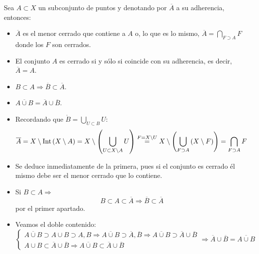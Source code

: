 \begin{prop}
Sea $A\subset X$ un subconjunto de puntos y denotando por $\overline{A}$ a su adherencia, entonces:
\begin{itemize}
\item $\overline{A}$ es el menor cerrado que contiene a $A$ o, lo que es lo mismo, $\overline{A} = \bigcap_{F \supset A} F$ donde los $F$ son cerrados.

\item El conjunto $A$ es cerrado si y sólo si coincide con su adherencia, es decir, $\overline{A} = A$.

\item $B \subset A \Rightarrow \overline{B} \subset \overline{A}$.
\item $\overline{A \cup B} = \overline{A} \cup \overline{B}$.
\end{itemize}
\end{prop}
\begin{demo}
\begin{itemize}
\item Recordando que $\mathring{B} = \bigcup_{U \subset B} U$:
$$
\overline{A} = X \setminus \operatorname{Int}\left( X \setminus A \right) = X \setminus \left(\bigcup_{U \subset X \setminus A} U \right) \stackrel{F = X \setminus U}{=} X \setminus \left(\bigcup_{F \supset A} \left( X \setminus F \right) \right) = \bigcap_{F \supset A} F
$$
\item Se deduce inmediatamente de la primera, pues si el conjunto es cerrado él mismo debe ser el menor cerrado que lo contiene.
\item Si $B \subset A \Rightarrow$
$$
B \subset A \subset \overline{A} \Rightarrow \overline{B} \subset \overline{A}
$$
por el primer apartado.
\item Veamos el doble contenido:
$$
\begin{cases}
	\overline{A\cup B} \supset A \cup B \supset
		A,B \Rightarrow \overline{A\cup B} \supset
		\overline{A}, \overline{B} \Rightarrow \overline{A\cup B} \supset \overline{A} \cup \overline{B} \\
	A \cup B \subset \overline{A} \cup \overline{B} \Rightarrow \overline{A\cup B} \subset \overline{A} \cup \overline{B}
\end{cases} \Rightarrow \overline{A}\cup \overline{B} = \overline{A\cup B}
$$
\end{itemize}
\end{demo}

